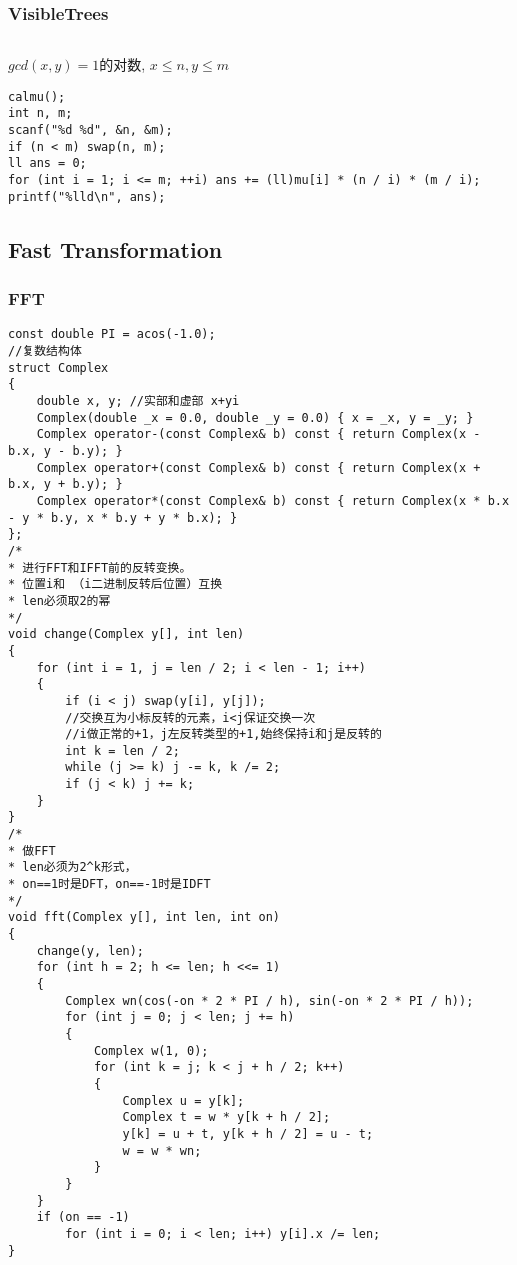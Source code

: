 \documentclass[twoside]{article}
\begin{document}
\subsubsection{VisibleTrees}
\begin{lstlisting}
\end{lstlisting}
$gcd(x,y)=1$的对数, $x \leq n, y \leq m$
\begin{lstlisting}
calmu();
int n, m;
scanf("%d %d", &n, &m);
if (n < m) swap(n, m);
ll ans = 0;
for (int i = 1; i <= m; ++i) ans += (ll)mu[i] * (n / i) * (m / i);
printf("%lld\n", ans);
\end{lstlisting}
\subsection{Fast Transformation}
\subsubsection{FFT}
\begin{lstlisting}
const double PI = acos(-1.0);
//复数结构体
struct Complex
{
    double x, y; //实部和虚部 x+yi
    Complex(double _x = 0.0, double _y = 0.0) { x = _x, y = _y; }
    Complex operator-(const Complex& b) const { return Complex(x - b.x, y - b.y); }
    Complex operator+(const Complex& b) const { return Complex(x + b.x, y + b.y); }
    Complex operator*(const Complex& b) const { return Complex(x * b.x - y * b.y, x * b.y + y * b.x); }
};
/*
* 进行FFT和IFFT前的反转变换。
* 位置i和 （i二进制反转后位置）互换
* len必须取2的幂
*/
void change(Complex y[], int len)
{
    for (int i = 1, j = len / 2; i < len - 1; i++)
    {
        if (i < j) swap(y[i], y[j]);
        //交换互为小标反转的元素，i<j保证交换一次
        //i做正常的+1，j左反转类型的+1,始终保持i和j是反转的
        int k = len / 2;
        while (j >= k) j -= k, k /= 2;
        if (j < k) j += k;
    }
}
/*
* 做FFT
* len必须为2^k形式，
* on==1时是DFT，on==-1时是IDFT
*/
void fft(Complex y[], int len, int on)
{
    change(y, len);
    for (int h = 2; h <= len; h <<= 1)
    {
        Complex wn(cos(-on * 2 * PI / h), sin(-on * 2 * PI / h));
        for (int j = 0; j < len; j += h)
        {
            Complex w(1, 0);
            for (int k = j; k < j + h / 2; k++)
            {
                Complex u = y[k];
                Complex t = w * y[k + h / 2];
                y[k] = u + t, y[k + h / 2] = u - t;
                w = w * wn;
            }
        }
    }
    if (on == -1)
        for (int i = 0; i < len; i++) y[i].x /= len;
}
\end{lstlisting}
\end{document}
